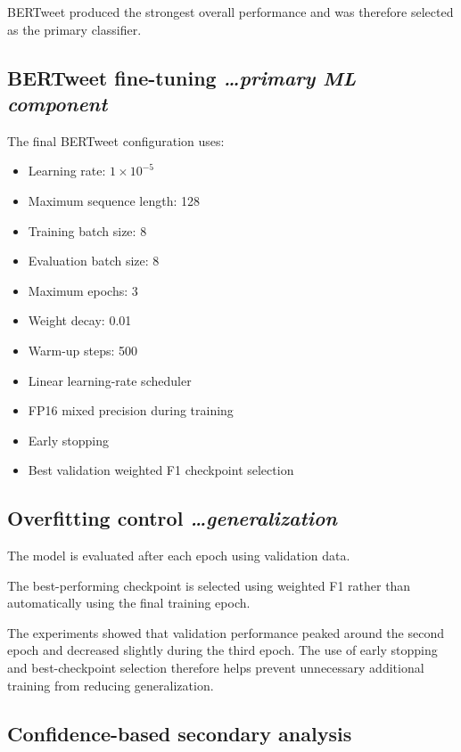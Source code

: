 \documentclass[11pt,a4paper]{article}
\newcommand{\BvrHint}[1]{%
  {\normalfont\normalsize\itshape\hfill #1}}
\begin{document}
BERTweet produced the strongest overall performance and was therefore selected
as the primary classifier.

\subsection{BERTweet fine-tuning %
\BvrHint{\ldots primary ML component}}

The final BERTweet configuration uses:

\begin{itemize}[leftmargin=0.7cm]

    \item Learning rate: $1\times10^{-5}$
    \item Maximum sequence length: 128
    \item Training batch size: 8
    \item Evaluation batch size: 8
    \item Maximum epochs: 3
    \item Weight decay: 0.01
    \item Warm-up steps: 500
    \item Linear learning-rate scheduler
    \item FP16 mixed precision during training
    \item Early stopping
    \item Best validation weighted F1 checkpoint selection

\end{itemize}

\subsection{Overfitting control %
\BvrHint{\ldots generalization}}

The model is evaluated after each epoch using validation data.

The best-performing checkpoint is selected using weighted F1 rather than
automatically using the final training epoch.

The experiments showed that validation performance peaked around the second
epoch and decreased slightly during the third epoch. The use of early
stopping and best-checkpoint selection therefore helps prevent unnecessary
additional training from reducing generalization.

\subsection{Confidence-based secondary analysis}
\end{document}
